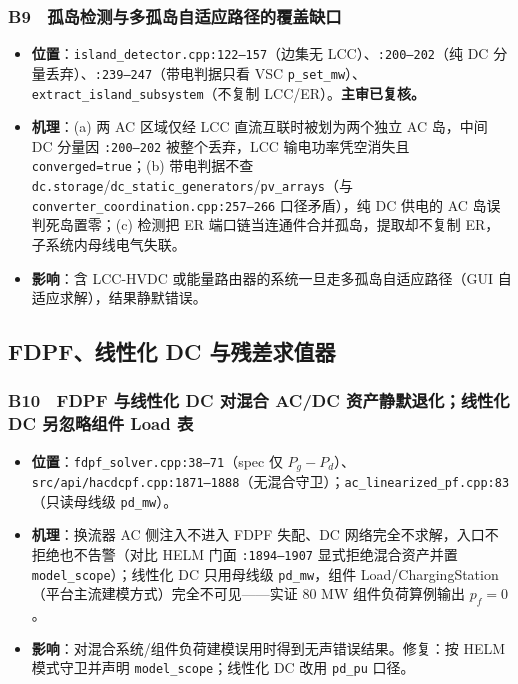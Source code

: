 \documentclass[11pt,a4paper,fontset=fandol]{ctexart}
\newcommand{\file}[1]{\texttt{#1}}
\begin{document}
\subsubsection*{B9　孤岛检测与多孤岛自适应路径的覆盖缺口}
\begin{itemize}
  \item \textbf{位置}：\file{island\_detector.cpp:122--157}（边集无 LCC）、\file{:200--202}（纯 DC 分量丢弃）、\file{:239--247}（带电判据只看 VSC \texttt{p\_set\_mw}）、\file{extract\_island\_subsystem}（不复制 LCC/ER）。\textbf{主审已复核。}
  \item \textbf{机理}：(a) 两 AC 区域仅经 LCC 直流互联时被划为两个独立 AC 岛，中间 DC 分量因 \file{:200--202} 被整个丢弃，LCC 输电功率凭空消失且 \texttt{converged=true}；(b) 带电判据不查 \file{dc.storage}/\file{dc\_static\_generators}/\file{pv\_arrays}（与 \file{converter\_coordination.cpp:257--266} 口径矛盾），纯 DC 供电的 AC 岛误判死岛置零；(c) 检测把 ER 端口链当连通件合并孤岛，提取却不复制 ER，子系统内母线电气失联。
  \item \textbf{影响}：含 LCC-HVDC 或能量路由器的系统一旦走多孤岛自适应路径（GUI 自适应求解），结果静默错误。
\end{itemize}

\subsection{FDPF、线性化 DC 与残差求值器}

\subsubsection*{B10　FDPF 与线性化 DC 对混合 AC/DC 资产静默退化；线性化 DC 另忽略组件 Load 表}
\begin{itemize}
  \item \textbf{位置}：\file{fdpf\_solver.cpp:38--71}（spec 仅 $P_g-P_d$）、\file{src/api/hacdcpf.cpp:1871--1888}（无混合守卫）；\file{ac\_linearized\_pf.cpp:83}（只读母线级 \texttt{pd\_mw}）。
  \item \textbf{机理}：换流器 AC 侧注入不进入 FDPF 失配、DC 网络完全不求解，入口不拒绝也不告警（对比 HELM 门面 \file{:1894--1907} 显式拒绝混合资产并置 \texttt{model\_scope}）；线性化 DC 只用母线级 \texttt{pd\_mw}，组件 Load/ChargingStation（平台主流建模方式）完全不可见——实证 80 MW 组件负荷算例输出 $p_f=0$。
  \item \textbf{影响}：对混合系统/组件负荷建模误用时得到无声错误结果。修复：按 HELM 模式守卫并声明 \texttt{model\_scope}；线性化 DC 改用 \texttt{pd\_pu} 口径。
\end{itemize}
\end{document}

